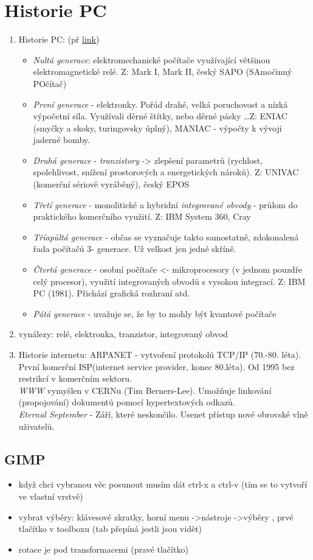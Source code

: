 \documentclass[12pt]{article}
\begin{document}
\section{Historie PC}
\begin{enumerate}
\item Historie PC: (př \href{https://historiepocitacu.cz/obecny-prehled-generaci-pocitacu.html}{link})
\begin{itemize}
\item \emph{Nultá generace}: elektromechanické počítače využívající většinou elektromagnetické relé. Z: Mark I, Mark II, český SAPO (SAmočinný POčítač)
\item \emph{První generace} - elektronky. Pořád drahé, velká poruchovost a nízká výpočetní síla. Využívali děrné štítky, nebo děrné pásky \dots Z: ENIAC (smyčky a skoky, turingovsky úplný), MANIAC - výpočty k vývoji jaderné bomby.
\item \emph{Druhá generace} -  \emph{tranzistory} -> zlepšení parametrů (rychlost, spolehlivost, snížení prostorových a energetických nároků). Z: UNIVAC (komerční sériově vyráběný), český EPOS
\item  \emph{Třetí generace} - monolitické a hybridní \emph{integrované obvody} - průlom do praktického komerčního využití. Z: IBM System 360, Cray
\item \emph{Tříapůltá generace} - občas se vyznačuje takto samostatně, zdokonalená řada počítačů 3- generace. Už velkost jen jedné skříně.
\item \emph{Čtvrtá generace} - osobní počítače <- mikroprocesory (v jednom pouzdře celý procesor), využití integrovaných obvodů s vysokou integrací. Z: IBM PC (1981). Přichází grafická rozhraní atd.
\item \emph{Pátá generace} - uvažuje se, že by to mohly být kvantové počítače
\end{itemize}
\item vynálezy: relé, elektronka, tranzistor, integrovaný obvod
\item Historie internetu: ARPANET - vytvoření protokolů TCP/IP (70.-80. léta). První komerční ISP(internet service provider, konec 80.léta). Od 1995 bez restrikcí v komerčním sektoru.\\
\emph{WWW} vymyšlen v CERNu (Tim Berners-Lee). Umožňuje linkování (propojování) dokumentů pomocí hypertextových odkazů.\\
\emph{Eternal September} - Září, které neskončilo. Usenet přístup nové obrovské vlně uživatelů. 
\end{enumerate}
\subsection{GIMP}
\begin{itemize}
\item když chci vybranou věc posunout musím dát ctrl-x a ctrl-v (tím se to vytvoří ve vlastní vrstvě)
\item vybrat výběry: klávesové zkratky, horní menu ->nástroje ->výběry , prvé tlačítko v toolboxu (tab přepíná jestli jsou vidět)
\item rotace je pod transformacemi (pravé tlačítko)
\end{itemize}
\end{document}
